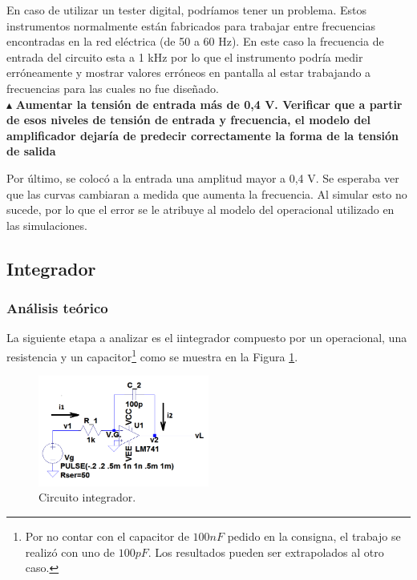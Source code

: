 En caso de utilizar un tester digital, podríamos tener un problema. Estos instrumentos normalmente están fabricados para trabajar entre frecuencias encontradas en la red eléctrica (de 50 a 60 Hz). En este caso la frecuencia de entrada del circuito esta a 1 kHz por lo que el instrumento podría medir erróneamente  y mostrar valores erróneos en pantalla al estar trabajando a frecuencias para las cuales no fue diseñado.\\

\noindent$\blacktriangle$\textbf{ Aumentar la tensión de entrada más de 0,4 V. Verificar que a partir de esos niveles de tensión de entrada y frecuencia, el modelo del amplificador dejaría de predecir correctamente la forma de la tensión de salida}

Por último, se colocó a la entrada una amplitud mayor a 0,4 V. Se esperaba ver que las curvas cambiaran a medida que aumenta la frecuencia. Al simular esto no sucede, por lo que el error se le atribuye al modelo del operacional utilizado en las simulaciones.







\subsection{Integrador}


\subsubsection{Análisis teórico}


La siguiente etapa a analizar es el iintegrador compuesto por un operacional, una resistencia y un capacitor\footnote{Por no contar con el capacitor de $100 nF$ pedido en la consigna, el trabajo se realizó con uno de $100 pF$. Los resultados pueden ser extrapolados al otro caso.} como se muestra en la Figura \ref{circ:int1}.

\begin{figure}[H]
  \centering
      \includegraphics[width=0.5\textwidth]{gfx_22/circ_int1}
  \caption{Circuito integrador.}
  \label{circ:int1}
\end{figure}

